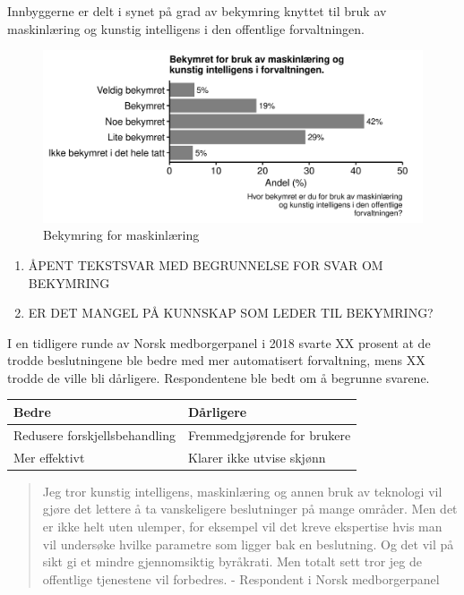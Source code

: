 \documentclass[
]{book}
\begin{document}
Innbyggerne er delt i synet på grad av bekymring knyttet til bruk av maskinlæring og kunstig intelligens i den offentlige forvaltningen.

\begin{figure}
\centering
\includegraphics{figs/png/fig_ml_worried.png}
\caption{Bekymring for maskinlæring}
\end{figure}

\begin{enumerate}
\def\labelenumi{\arabic{enumi}.}
\item
  ÅPENT TEKSTSVAR MED BEGRUNNELSE FOR SVAR OM BEKYMRING
\item
  ER DET MANGEL PÅ KUNNSKAP SOM LEDER TIL BEKYMRING?
\end{enumerate}

I en tidligere runde av Norsk medborgerpanel i 2018 svarte XX prosent at de trodde beslutningene ble bedre med mer automatisert forvaltning, mens XX trodde de ville bli dårligere.
Respondentene ble bedt om å begrunne svarene.

\begin{longtable}[]{@{}ll@{}}
\toprule
Bedre & Dårligere \\
\midrule
\endhead
Redusere forskjellsbehandling & Fremmedgjørende for brukere \\
Mer effektivt & Klarer ikke utvise skjønn \\
\bottomrule
\end{longtable}

\begin{quote}
Jeg tror kunstig intelligens, maskinlæring og annen bruk av teknologi vil gjøre det lettere å ta vanskeligere beslutninger på mange områder.
Men det er ikke helt uten ulemper, for eksempel vil det kreve ekspertise hvis man vil undersøke hvilke parametre som ligger bak en beslutning.
Og det vil på sikt gi et mindre gjennomsiktig byråkrati.
Men totalt sett tror jeg de offentlige tjenestene vil forbedres.
- Respondent i Norsk medborgerpanel
\end{quote}
\end{document}
